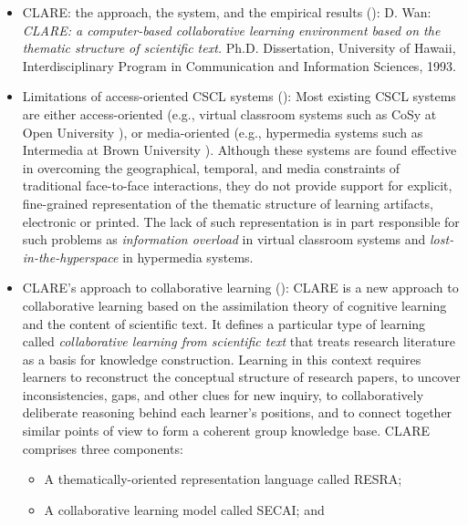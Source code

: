 \small
\begin{itemize}
\item {\sf CLARE: the approach, the system, and the empirical results
  ()\/}: D. Wan: {\it CLARE: a computer-based
  collaborative learning environment based on the thematic structure of
  scientific text.\/} Ph.D. Dissertation, University of Hawaii,
  Interdisciplinary Program in Communication and Information Sciences,
  1993.
  
\item {\sf Limitations of access-oriented CSCL systems ()\/}: Most existing CSCL systems are either access-oriented
  (e.g., virtual classroom systems such as CoSy at Open University \cite
  {Mason89}), or media-oriented (e.g., hypermedia systems such as
  Intermedia at Brown University \cite{Landow90Hypertext}).  Although these
  systems are found effective in overcoming the geographical, temporal, and
  media constraints of traditional face-to-face interactions, they do not
  provide support for explicit, fine-grained representation of the thematic
  structure of learning artifacts, electronic or printed. The lack of such
  representation is in part responsible for such problems as {\it
  information overload\/} in virtual classroom systems and {\it
  lost-in-the-hyperspace\/} in hypermedia systems.
  
\item {\sf CLARE's approach to collaborative learning ()\/}: CLARE is a new approach to collaborative learning based
  on the assimilation theory of cognitive learning and the content of
  scientific text. It defines a particular type of learning called {\it
  collaborative learning from scientific text} that treats research
  literature as a basis for knowledge construction. Learning in this
  context requires learners to reconstruct the conceptual structure of
  research papers, to uncover inconsistencies, gaps, and other clues for
  new inquiry, to collaboratively deliberate reasoning behind each
  learner's positions, and to connect together similar points of view to
  form a coherent group knowledge base. CLARE comprises three components:

  \begin{itemize}
  \item A thematically-oriented representation language called RESRA;
    
  \item A collaborative learning model called SECAI; and
    

\end{itemize}
\end{itemize}
